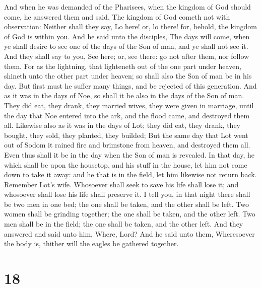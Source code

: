  And when he was demanded of the Pharisees, when the
kingdom of God should come, he answered them and said, The kingdom of
God cometh not with observation:  Neither shall they say,
Lo here! or, lo there! for, behold, the kingdom of God is within you.
 And he said unto the disciples, The days will come, when
ye shall desire to see one of the days of the Son of man, and ye shall
not see it.  And they shall say to you, See here; or, see
there: go not after them, nor follow them.  For as the
lightning, that lighteneth out of the one part under heaven, shineth
unto the other part under heaven; so shall also the Son of man be in his
day.  But first must he suffer many things, and be rejected
of this generation.  And as it was in the days of Noe, so
shall it be also in the days of the Son of man.  They did
eat, they drank, they married wives, they were given in marriage, until
the day that Noe entered into the ark, and the flood came, and destroyed
them all.  Likewise also as it was in the days of Lot; they
did eat, they drank, they bought, they sold, they planted, they builded;
 But the same day that Lot went out of Sodom it rained fire
and brimstone from heaven, and destroyed them all.  Even
thus shall it be in the day when the Son of man is revealed.
 In that day, he which shall be upon the housetop, and his
stuff in the house, let him not come down to take it away: and he that
is in the field, let him likewise not return back. 
Remember Lot's wife.  Whosoever shall seek to save his life
shall lose it; and whosoever shall lose his life shall preserve it.
 I tell you, in that night there shall be two men in one
bed; the one shall be taken, and the other shall be left. 
Two women shall be grinding together; the one shall be taken, and the
other left.  Two men shall be in the field; the one shall
be taken, and the other left.  And they answered and said
unto him, Where, Lord? And he said unto them, Wheresoever the body is,
thither will the eagles be gathered together.

\hypertarget{section-17}{%
\section{18}\label{section-17}}

